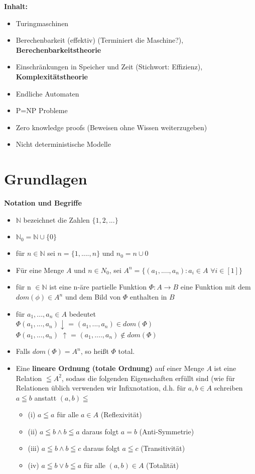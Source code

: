 \textbf{Inhalt:}
\begin{itemize}
    \item Turingmaschinen
    \item Berechenbarkeit (effektiv) (Terminiert die Maschine?), \textbf{Berechenbarkeitstheorie}
    \item Einschränkungen in Speicher und Zeit (Stichwort: Effizienz), \textbf{Komplexitätstheorie}
    \item Endliche Automaten
    \item P=NP Probleme
    \item Zero knowledge proofs (Beweisen ohne Wissen weiterzugeben)
    \item Nicht deterministische Modelle

\end{itemize}

\section{Grundlagen}

\textbf{Notation und Begriffe}
\begin{itemize}
    \item $\mathbb{N}$ bezeichnet die Zahlen $\{1,2,...\}$
    \item $\mathbb{N}_0 =\mathbb{N} \cup \{0\}$
    \item für $n \in \mathbb{N}$ sei $n=\{1,....,n\}$ und $n_0 = n \cup{0}$
    \item Für eine Menge $A$ und $n \in N_0$, sei $A^n = \{(a_1,....,a_n): a_i \in A$ $\forall i \in [1]\}$
    \item für n $\in \mathbb{N}$ ist eine n-äre partielle Funktion $\Phi: A \rightarrow B$ eine Funktion mit dem $dom(\phi) \in A^n$ und dem Bild von $\Phi$ enthalten in $B$
    \item für $a_1,...,a_n \in A$ bedeutet \\
    $\Phi (a_1,...,a_n) \downarrow$ = $(a_1,...,a_n) \in dom (\Phi)$ \\
    $\Phi(a_1,...,a_n)$ $\uparrow$ = $(a_1,....,a_n) \notin dom(\Phi)$

    \item Falls $dom(\Phi)=A^n$, so heißt $\Phi$ total.

    \item Eine \textbf{lineare Ordnung (totale Ordnung)} auf einer Menge $A$ ist eine Relation $\leqq A^2$, sodass die folgenden Eigenschaften erfüllt sind (wie für Relationen üblich verwenden wir Infixnotation, d.h. für $a,b \in A$ schreiben  $a \leqq b$ anstatt $(a,b)\leqq$
    \begin{itemize}
        \item (i) $a \leqq a$ für alle $a \in A$ (Reflexivität) 
        \item (ii) $a \leqq b \land b \leqq a$ daraus folgt $a=b$ (Anti-Symmetrie)
        \item (iii) $a \leqq b \land b \leqq c$ daraus folgt $a \leqq c$ (Transitivität)
        \item (iv) $a \leqq b \lor b \leqq a$ für alle $(a,b)\in A$ (Totalität)
    \end{itemize}
\end{itemize}
\vspace{3em}

